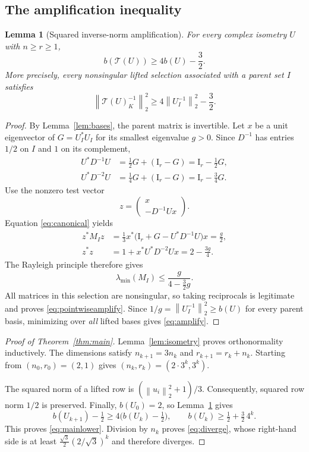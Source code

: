 \documentclass[11pt,letterpaper]{article}
\newtheorem{lemma}[theorem]{Lemma}
\theoremstyle{definition}
\theoremstyle{remark}
\newcommand{\Id}{\mathrm I}
\newcommand{\T}{\mathcal T}
\newcommand{\norm}[1]{\left\lVert#1\right\rVert}
\begin{document}
\subsection{The amplification inequality}

\begin{lemma}[Squared inverse-norm amplification]\label{lem:amplify}
For every complex isometry $U$ with $n\ge r\ge1$,
\begin{equation}
 b(\T(U))\ge4b(U)-\frac32.
 \label{eq:amplify}
\end{equation}
More precisely, every nonsingular lifted selection associated with a parent set $I$ satisfies
\begin{equation}
 \norm{\T(U)_K^{-1}}_2^2
 \ge4\norm{U_I^{-1}}_2^2-\frac32.
 \label{eq:pointwiseamplify}
\end{equation}
\end{lemma}
\begin{proof}
By Lemma~\ref{lem:bases}, the parent matrix is invertible. Let $x$ be a unit eigenvector of $G=U_I^*U_I$ for its smallest eigenvalue $g>0$. Since $D^{-1}$ has entries $1/2$ on $I$ and $1$ on its complement,
\begin{align*}
 U^*D^{-1}U&=\tfrac12G+(\Id_r-G)=\Id_r-\tfrac12G,\\
 U^*D^{-2}U&=\tfrac14G+(\Id_r-G)=\Id_r-\tfrac34G.
\end{align*}
Use the nonzero test vector
\[
 z=\begin{pmatrix}x\\-D^{-1}Ux\end{pmatrix}.
\]
Equation \eqref{eq:canonical} yields
\begin{align*}
 z^*M_Iz
 &=\frac13x^*\bigl(\Id_r+G-U^*D^{-1}U\bigr)x
 =\frac g2,\\
 z^*z&=1+x^*U^*D^{-2}Ux=2-\frac{3g}{4}.
\end{align*}
The Rayleigh principle therefore gives
\[
 \lambda_{\min}(M_I)\le\frac{g}{4-\frac32g}.
\]
All matrices in this selection are nonsingular, so taking reciprocals is legitimate and proves \eqref{eq:pointwiseamplify}. Since $1/g=\norm{U_I^{-1}}_2^2\ge b(U)$ for every parent basis, minimizing over \emph{all} lifted bases gives \eqref{eq:amplify}.
\end{proof}

\begin{proof}[Proof of Theorem~\ref{thm:main}]
Lemma~\ref{lem:isometry} proves orthonormality inductively. The dimensions satisfy $n_{k+1}=3n_k$ and $r_{k+1}=r_k+n_k$. Starting from $(n_0,r_0)=(2,1)$ gives $(n_k,r_k)=(2\cdot3^k,3^k)$.

The squared norm of a lifted row is $(\norm{u_i}_2^2+1)/3$. Consequently, squared row norm $1/2$ is preserved. Finally, $b(U_0)=2$, so Lemma~\ref{lem:amplify} gives
\[
 b(U_{k+1})-\tfrac12\ge4\bigl(b(U_k)-\tfrac12\bigr),
 \qquad b(U_k)\ge\tfrac12+\tfrac32\,4^k.
\]
This proves \eqref{eq:mainlower}. Division by $n_k$ proves \eqref{eq:diverge}, whose right-hand side is at least
$\frac{\sqrt3}{2}(2/\sqrt3)^k$ and therefore diverges.
\end{proof}
\end{document}
